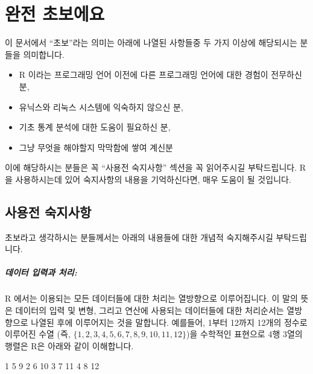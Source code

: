 \documentclass{report}
\begin{document}
\chapter{완전 초보에요}

이 문서에서 ``초보''라는 의미는 아래에 나열된 사항들중 두 가지 이상에 해당되시는 분들을 의미합니다. 

\begin{itemize}
\item R 이라는 프로그래밍 언어 이전에 다른 프로그래밍 언어에 대한 경험이 전무하신 분,
\item 유닉스와 리눅스 시스템에 익숙하지 않으신 분,
\item 기초 통계 분석에 대한 도움이 필요하신 분,
\item 그냥 무엇을 해야할지 막막함에 쌓여 계신분 
\end{itemize}

이에 해당하시는 분들은 꼭 ``사용전 숙지사항'' 섹션을 꼭 읽어주시길 부탁드립니다.
R을 사용하시는데 있어 숙지사항의 내용을 기억하신다면, 매우 도움이 될 것입니다. 

\section{사용전 숙지사항}

초보라고 생각하시는 분들께서는 아래의 내용들에 대한 개념적 숙지해주시길 부탁드립니다.

\paragraph{데이터 입력과 처리:}  R 에서는 이용되는 모든 데이터들에 대한 처리는 열방향으로 이루어집니다.
이 말의 뜻은 데이터의 입력 및 변형, 그리고 연산에 사용되는 데이터들에 대한 처리순서는 열방향으로 나열된 후에 이루어지는 것을 말합니다. 
예를들어, 1부터 12까지 12개의 정수로 이루어진 수열 (즉, $\{ 1, 2, 3, 4, 5, 6, 7, 8, 9, 10, 11, 12 \}$)을 수학적인 표현으로 4행 3열의 행렬은 R은 아래와 같이 이해합니다. 



\begin{Schunk}
\begin{Soutput}
1  5   9
2  6  10
3  7  11
4  8  12
\end{Soutput}
\end{Schunk}
\end{document}
